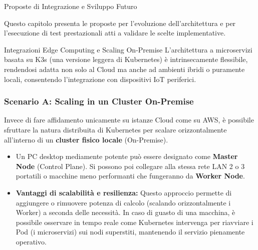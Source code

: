 \begin{mychapter}{Proposte di Integrazione e Sviluppo Futuro}

Questo capitolo presenta le proposte per l'evoluzione dell'architettura e per l'esecuzione di test prestazionali atti a validare le scelte implementative.

\begin{mysection}{Integrazioni Edge Computing e Scaling On-Premise}
L'architettura a microservizi basata su K3s (una versione leggera di Kubernetes) \`e intrinsecamente flessibile, rendendosi adatta non solo al Cloud ma anche ad ambienti ibridi o puramente locali, consentendo l'integrazione con dispositivi IoT periferici.

\subsubsection*{Scenario A: Scaling in un Cluster On-Premise}
Invece di fare affidamento unicamente su istanze Cloud come su AWS, \`e possibile sfruttare la natura distribuita di Kubernetes per scalare orizzontalmente all'interno di un \textbf{cluster fisico locale} (On-Premise). 
\begin{itemize}
    \item Un PC desktop mediamente potente può essere designato come \textbf{Master Node} (Control Plane). Si possono poi collegare alla stessa rete LAN 2 o 3 portatili o macchine meno performanti che fungeranno da \textbf{Worker Node}.
    \item \textbf{Vantaggi di scalabilità e resilienza:} Questo approccio permette di aggiungere o rimuovere potenza di calcolo (scalando orizzontalmente i Worker) a seconda delle necessità. In caso di guasto di una macchina, è possibile osservare in tempo reale come Kubernetes intervenga per riavviare i Pod (i microservizi) sui nodi superstiti, mantenendo il servizio pienamente operativo.
\end{itemize}


\end{mysection}
\end{mychapter}
